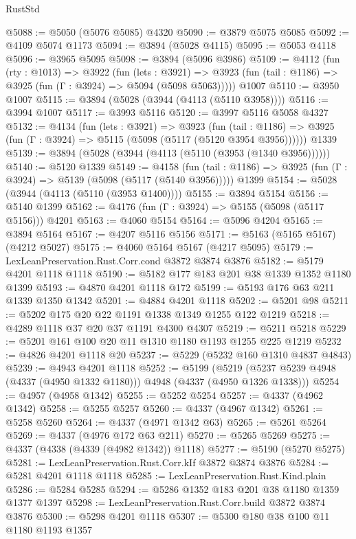 \begin{lexlean}{RustStd}
\begin{coremodule}
@5088 := @5050 (@5076 @5085) @4320
@5090 := @3879 @5075 @5085
@5092 := @4109 @5074 @1173
@5094 := @3894 (@5028 @4115)
@5095 := @5053 @4118
@5096 := @3965 @5095
@5098 := @3894 (@5096 @3986)
@5109 := @4112
    (fun (rty : @1013) =>
    @3922
      (fun (lets : @3921) =>
      @3923 (fun (tail : @1186) => @3925 (fun (Γ : @3924) => @5094 (@5098 @5063)))))
    @1007
@5110 := @3950 @1007
@5115 := @3894 (@5028 (@3944 (@4113 (@5110 @3958))))
@5116 := @3994 @1007
@5117 := @3993 @5116
@5120 := @3997 @5116 @5058 @4327
@5132 := @4134
    (fun (lets : @3921) =>
    @3923
      (fun (tail : @1186) => @3925 (fun (Γ : @3924) => @5115 (@5098 (@5117 (@5120 @3954 @3956))))))
    @1339
@5139 := @3894 (@5028 (@3944 (@4113 (@5110 (@3953 (@1340 @3956))))))
@5140 := @5120 @1339
@5149 := @4158
    (fun (tail : @1186) => @3925 (fun (Γ : @3924) => @5139 (@5098 (@5117 (@5140 @3956)))))
    @1399
@5154 := @5028 (@3944 (@4113 (@5110 (@3953 @1400))))
@5155 := @3894 @5154
@5156 := @5140 @1399
@5162 := @4176 (fun (Γ : @3924) => @5155 (@5098 (@5117 @5156))) @4201
@5163 := @4060 @5154
@5164 := @5096 @4204
@5165 := @3894 @5164
@5167 := @4207 @5116 @5156
@5171 := @5163 (@5165 @5167) (@4212 @5027)
@5175 := @4060 @5164 @5167 (@4217 @5095)
@5179 := LexLeanPreservation.Rust.Corr.cond @3872 @3874 @3876
@5182 := @5179 @4201 @1118 @1118
@5190 := @5182 @177 @183 @201 @38 @1339 @1352 @1180 @1399
@5193 := @4870 @4201 @1118 @172
@5199 := @5193 @176 @63 @211 @1339 @1350 @1342
@5201 := @4884 @4201 @1118
@5202 := @5201 @98
@5211 := @5202 @175 @20 @22 @1191 @1338 @1349 @1255 @122 @1219
@5218 := @4289 @1118 @37 @20 @37 @1191 @4300 @4307
@5219 := @5211 @5218
@5229 := @5201 @161 @100 @20 @11 @1310 @1180 @1193 @1255 @225 @1219
@5232 := @4826 @4201 @1118 @20
@5237 := @5229 (@5232 @160 @1310 @4837 @4843)
@5239 := @4943 @4201 @1118
@5252 := @5199
    (@5219 (@5237 @5239 @4948 (@4337 (@4950 @1332 @1180))) @4948 (@4337 (@4950 @1326 @1338)))
@5254 := @4957 (@4958 @1342)
@5255 := @5252 @5254
@5257 := @4337 (@4962 @1342)
@5258 := @5255 @5257
@5260 := @4337 (@4967 @1342)
@5261 := @5258 @5260
@5264 := @4337 (@4971 @1342 @63)
@5265 := @5261 @5264
@5269 := @4337 (@4976 @172 @63 @211)
@5270 := @5265 @5269
@5275 := @4337 (@4338 (@4339 (@4982 @1342)) @1118)
@5277 := @5190 (@5270 @5275)
@5281 := LexLeanPreservation.Rust.Corr.kIf @3872 @3874 @3876
@5284 := @5281 @4201 @1118 @1118
@5285 := LexLeanPreservation.Rust.Kind.plain
@5286 := @5284 @5285
@5294 := @5286 @1352 @183 @201 @38 @1180 @1359 @1377 @1397
@5298 := LexLeanPreservation.Rust.Corr.build @3872 @3874 @3876
@5300 := @5298 @4201 @1118
@5307 := @5300 @180 @38 @100 @11 @1180 @1193 @1357

\end{coremodule}
\end{lexlean}
